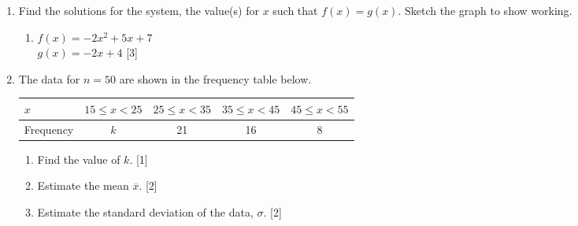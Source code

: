 \documentclass[12pt, twoside]{article}
\begin{document}
\begin{enumerate}
\newpage
    \item Find the solutions for the system, the value(s) for $x$ such that $f(x)=g(x)$. Sketch the graph to show working.
    \begin{enumerate}
        \item $f(x)=-2x^2+5x+7$ \\[0.25cm] $g(x)=-2x+4$ \hfill [3] \vspace{0.3cm}
    \end{enumerate}

\item The data for $n=50$ are shown in the frequency table below.
    \begin{center}
        \begin{tabular}{|l|c|c|c|c|}
            \hline
            $x$ & $15 \leq x < 25$ & $25 \leq x < 35$ & $35 \leq x < 45$ & $45 \leq x < 55$\\ 
            \hline 
            Frequency & $k$ & 21 & 16 & 8\\ 
            \hline 
            \end{tabular}
    \end{center}
    \begin{enumerate}
        \item Find the value of $k$.  \hfill [1]
        \item Estimate the mean $\overline{x}$. \hfill [2]
        \item Estimate the standard deviation of the data, $\sigma$.  \hfill [2]
        \end{enumerate}
           
\end{enumerate}
\end{document}
